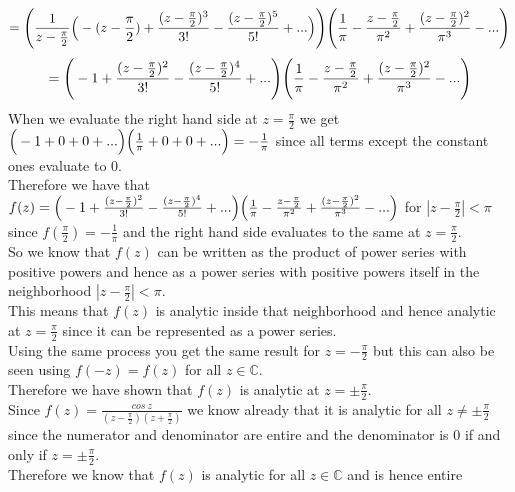 \documentclass{article}
\begin{document}
\begin{center}
    \[=\Bigg{(}\frac{1}{z -\frac{\pi}{2}}\Big{(}-(z -\frac{\pi}{2}) +\frac{(z -\frac{\pi}{2})^3}{3!} -\frac{(z -\frac{\pi}{2})^5}{5!} + ...\Big{)}\Bigg{)}\Bigg{(}\frac{1}{\pi} -\frac{z -\frac{\pi}{2}}{\pi ^2} +\frac{(z -\frac{\pi}{2})^2}{\pi ^3} - ...\Bigg{)}\]
    \[= \Bigg{(}-1 +\frac{(z -\frac{\pi}{2})^2}{3!} -\frac{(z -\frac{\pi}{2})^4}{5!} + ...\Bigg{)}\Bigg{(}\frac{1}{\pi} -\frac{z -\frac{\pi}{2}}{\pi ^2} +\frac{(z -\frac{\pi}{2})^2}{\pi ^3} - ...\Bigg{)}\]
    When we evaluate the right hand side at $z =\frac{\pi}{2}$ we get $\Big{(} -1 + 0 + 0 + ...\Big{)}\Big{(}\frac{1}{\pi} + 0 + 0 + ...\Big{)} = -\frac{1}{\pi}$ since all terms except the constant ones evaluate to 0.
    \\Therefore we have that $f(z) =\Big{(}-1 +\frac{(z -\frac{\pi}{2})^2}{3!} -\frac{(z -\frac{\pi}{2})^4}{5!} + ...\Big{)}\Big{(}\frac{1}{\pi} -\frac{z -\frac{\pi}{2}}{\pi ^2} +\frac{(z -\frac{\pi}{2})^2}{\pi ^3} - ...\Big{)}$ for $|z -\frac{\pi}{2}| <\pi$ since $f(\frac{\pi}{2}) = -\frac{1}{\pi}$ and the right hand side evaluates to the same at $z =\frac{\pi}{2}$.
    \\So we know that $f(z)$ can be written as the product of power series with positive powers and hence as a power series with positive powers itself in the neighborhood $|z -\frac{\pi}{2}| <\pi$.
    \\This means that $f(z)$ is analytic inside that neighborhood and hence analytic at $z =\frac{\pi}{2}$ since it can be represented as a power series.
    \\Using the same process you get the same result for $z = -\frac{\pi}{2}$ but this can also be seen using $f(-z) = f(z)$ for all $z\in\mathbb{C}$.
    \\Therefore we have shown that $f(z)$ is analytic at $z =\pm\frac{\pi}{2}$.
    \\Since $f(z) =\frac{cos\:z}{(z -\frac{\pi}{2})(z +\frac{\pi}{2})}$ we know already that it is analytic for all $z\neq\pm\frac{\pi}{2}$ since the numerator and denominator are entire and the denominator is 0 if and only if $z =\pm\frac{\pi}{2}$.
    \\Therefore we know that $f(z)$ is analytic for all $z\in\mathbb{C}$ and is hence entire \qedsymbol
\end{center}


\newpage
\end{document}
